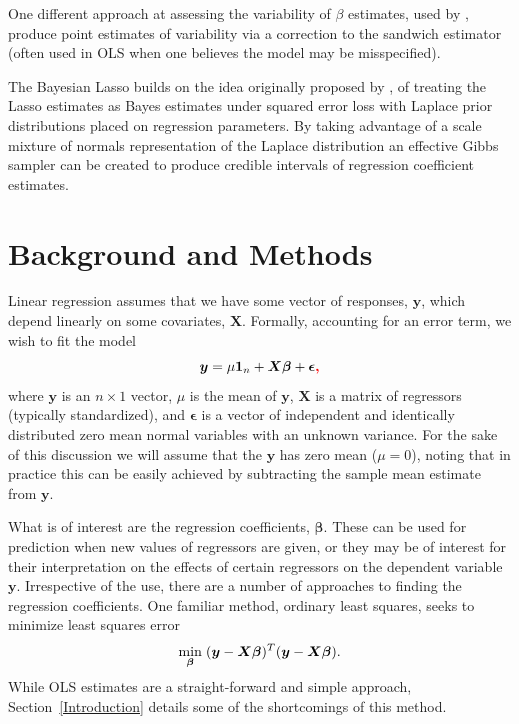 \documentclass{uwstat572}
\newcommand{\vmadd}[1]{\textbf{\color{red}{#1}}}
\begin{document}
One different approach at assessing the variability of $\beta$ estimates, used by \cite{fan2001variable}, produce point estimates of variability via a correction to the sandwich estimator (often used in OLS when one believes the model may be misspecified).

The Bayesian Lasso builds on the idea originally proposed by \cite{tibshirani1996regression}, of treating the Lasso estimates as Bayes estimates under squared error loss with Laplace prior distributions placed on regression parameters. By taking advantage of a scale mixture of normals representation of the Laplace distribution an effective Gibbs sampler can be created to produce credible intervals of regression coefficient estimates.

\section{Background and Methods}
Linear regression assumes that we have some vector of responses, $\boldsymbol{y}$, which depend linearly on some covariates, $\boldsymbol{X}$. Formally, accounting for an error term, we wish to fit the model \[
\boldsymbol{y} = \mu \boldsymbol{1}_n + \boldsymbol{X}\boldsymbol{\beta}+\boldsymbol{\epsilon}\vmadd{,}
\] where $\boldsymbol{y}$ is an $n \times 1$ vector, $\mu$ is the mean of $\boldsymbol{y}$, $\boldsymbol{X}$ is a matrix of regressors (typically standardized), and $\boldsymbol{\epsilon}$ is a vector of independent and identically distributed zero mean normal variables with an unknown variance. For the sake of this discussion we will assume that the $\boldsymbol{y}$ has zero mean ($\mu=0$), noting that in practice this can be easily achieved by subtracting the sample mean estimate from $\mathbf{y}$.

What is of interest are the regression coefficients, $\boldsymbol{\beta}$. These can be used for prediction when new values of regressors are given, or they may be of interest for their interpretation on the effects of certain regressors on the dependent variable $\boldsymbol{y}$. Irrespective of the use, there are a number of approaches to finding the regression coefficients. One familiar method, ordinary least squares, seeks to minimize least squares error\[
\min_{\boldsymbol{\beta}} \hspace{.1cm} (\boldsymbol{y}-\boldsymbol{X}\boldsymbol{\beta})^T(\boldsymbol{y}-\boldsymbol{X}\boldsymbol{\beta}).
\] While OLS estimates are a straight-forward and simple approach, Section~\ref{Introduction} details some of the shortcomings of this method.
\end{document}
